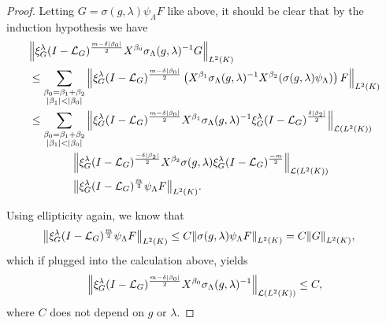 \begin{proof}
    Letting $G = \sigma(g, \lambda) \psi_\Lambda F$ like above,
    it should be clear that by the induction hypothesis we have
    \begin{align*}
        &\norm [\Lebesgue 2 \CompactGroup] {%
            \Rep \lambda \BesselPotential {m - \delta \abs {\beta_0}}
            \LeftDifferentialOperator {\beta_0} \sigma_\Lambda(g, \lambda)^{-1} G
        }\\
        &\leq
        \sum_{\substack{
            \beta_0 = \beta_1 + \beta_2\\
            \abs {\beta_1} < \abs {\beta_0}}
        }
        \norm [\Lebesgue 2 \CompactGroup] {%
            \Rep \lambda \BesselPotential {m - \delta \abs {\beta_0}}
            \left(
            \LeftDifferentialOperator {\beta_1} \sigma_\Lambda(g, \lambda)^{-1}
            \LeftDifferentialOperator {\beta_2} (\sigma(g, \lambda) \psi_\Lambda)\right) F
        }\\
        &\leq
        \sum_{\substack{
            \beta_0 = \beta_1 + \beta_2\\
            \abs {\beta_1} < \abs {\beta_0}}
        }
        \norm [\Lin {\Lebesgue 2 \CompactGroup}] {%
            \Rep \lambda \BesselPotential {m - \delta \abs {\beta_0}}
            \LeftDifferentialOperator {\beta_1} \sigma_\Lambda(g, \lambda)^{-1}
            \Rep \lambda \BesselPotential {\delta \abs {\beta_2}}
        }\\
        & \qquad\qquad
        \norm [\Lin {\Lebesgue 2 \CompactGroup}] {%
            \Rep \lambda \BesselPotential {-\delta \abs {\beta_2}}
            \LeftDifferentialOperator {\beta_2} \sigma(g, \lambda)
            \Rep \lambda \BesselPotential {-m}
        }\\
        & \qquad\qquad
        \norm [\Lebesgue 2 \CompactGroup] {\Rep \lambda \BesselPotential {m} \psi_\Lambda F}.
    \end{align*}

    Using ellipticity again,
    we know that
    \begin{align*}
        \norm [\Lebesgue 2 \CompactGroup] {\Rep \lambda \BesselPotential {m} \psi_\Lambda F}
        &\leq C \norm [\Lebesgue 2 \CompactGroup] {\sigma(g, \lambda) \psi_\Lambda F} = C \norm [\Lebesgue 2 \CompactGroup] {G},
    \end{align*}
    which if plugged into the calculation above,
    yields
    \begin{align*}
        \norm [\Lin {\Lebesgue 2 \CompactGroup}] {%
            \Rep \lambda \BesselPotential {m - \delta \abs {\beta_0}}
            \LeftDifferentialOperator {\beta_0} \sigma_\Lambda(g, \lambda)^{-1}
        } \leq C,
    \end{align*}
    where $C$ does not depend on $g$ or $\lambda$.


\end{proof}
